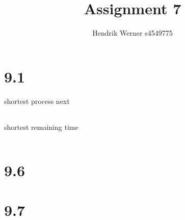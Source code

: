 \documentclass[12pt]{article}
\title{Assignment 7}
\author{Hendrik Werner s4549775}
\begin{document}
\maketitle

\section*{9.1}
\begin{description}
	\item[shortest process next]
	\begin{tabular}{|c|c|c|c|c|c|c|c|c|c|c|c|c|c|c|c|c|c|c|c|}
		\hline
		& & & & & & & & & & & & & & & & & & & \\
		\hline
	\end{tabular}

	\item[shortest remaining time]
	\begin{tabular}{|c|c|c|c|c|c|c|c|c|c|c|c|c|c|c|c|c|c|c|c|}
		\hline
		& & & & & & & & & & & & & & & & & & & \\
		\hline
	\end{tabular}
\end{description}

\section*{9.6}
\section*{9.7}
\end{document}
